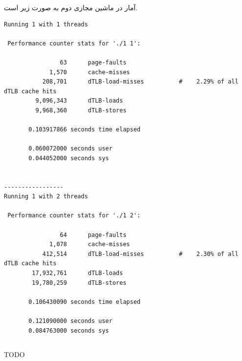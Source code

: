 \documentclass{article}
\begin{document}
آمار در ماشین مجازی دوم به صورت زیر است.
\begin{latin}
\begin{lstlisting}
Running 1 with 1 threads

 Performance counter stats for './1 1':

                63      page-faults                                                 
             1,570      cache-misses                                                
           208,701      dTLB-load-misses          #    2.29% of all dTLB cache hits 
         9,096,343      dTLB-loads                                                  
         9,968,360      dTLB-stores                                                 

       0.103917866 seconds time elapsed

       0.060072000 seconds user
       0.044052000 seconds sys


-----------------
Running 1 with 2 threads

 Performance counter stats for './1 2':

                64      page-faults                                                 
             1,078      cache-misses                                                
           412,514      dTLB-load-misses          #    2.30% of all dTLB cache hits 
        17,932,761      dTLB-loads                                                  
        19,780,259      dTLB-stores                                                 

       0.106430090 seconds time elapsed

       0.121090000 seconds user
       0.084763000 seconds sys
\end{lstlisting}
\end{latin}

\subsection{}
TODO

\section{}
\end{document}
